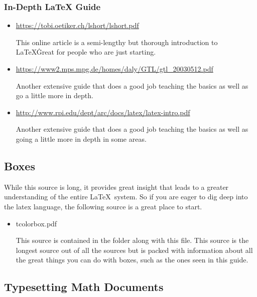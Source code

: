 \documentclass[12pt,hidelinks]{article}
\begin{document}
		\subsubsection{In-Depth LaTeX Guide}
			\begin{itemize}
				\item \url{https://tobi.oetiker.ch/lshort/lshort.pdf}
						\begin{absquote}
							This online article is a semi-lengthy but thorough introduction to \LaTeX\. Great for people who are just starting.
						\end{absquote}
				\item \url{https://www2.mps.mpg.de/homes/daly/GTL/gtl_20030512.pdf}
						\begin{absquote}
							Another extensive guide that does a good job teaching the basics as well as go a little more in depth.
						\end{absquote}
				\item \url{http://www.rpi.edu/dept/arc/docs/latex/latex-intro.pdf}
						\begin{absquote}
							Another extensive guide that does a good job teaching the basics as well as going a little more in depth in some areas. 
						\end{absquote}
			\end{itemize}
	\subsection{Boxes}
		While this source is long, it provides great insight that leads to a greater understanding of the entire \LaTeX \, system. So if you are eager to dig deep into the latex language, the following source is a great place to start.
		\begin{itemize}
			\item tcolorbox.pdf
				\begin{absquote}
					This source is contained in the folder along with this file. This source is the longest source out of all the sources but is packed with information about all the great things you can do with boxes, such as the ones seen in this guide.	
				\end{absquote}
		\end{itemize}
	\subsection{Typesetting Math Documents}\label{sec:exams}
\end{document}
